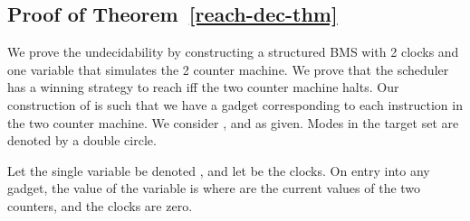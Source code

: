 
\subsection*{Proof of Theorem~\ref{reach-dec-thm}}


We prove the undecidability by constructing a structured BMS  with 2 clocks and one variable 
that simulates the 2 counter machine. We prove that the scheduler has a winning strategy 
to reach   iff the two counter machine halts. 
Our construction of  is such that we have a gadget corresponding to each instruction 
in the two counter machine.  We consider , and 
 as given.  Modes in the target set  
are denoted by a double circle. 

Let the single variable be denoted , and let  be the clocks. 
On entry into any gadget, the value of the variable  is  where  are the 
current values of the two counters, and the clocks  are zero. 
